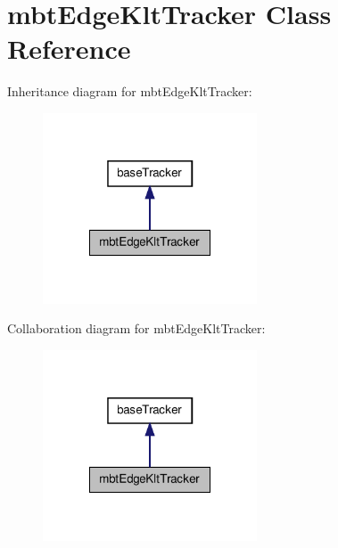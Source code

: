 \hypertarget{classmbtEdgeKltTracker}{\section{mbt\-Edge\-Klt\-Tracker \-Class \-Reference}
\label{classmbtEdgeKltTracker}
}


\-Inheritance diagram for mbt\-Edge\-Klt\-Tracker\-:\nopagebreak
\begin{figure}[H]
\begin{center}
\leavevmode
\includegraphics[width=180pt]{classmbtEdgeKltTracker__inherit__graph}
\end{center}
\end{figure}


\-Collaboration diagram for mbt\-Edge\-Klt\-Tracker\-:\nopagebreak
\begin{figure}[H]
\begin{center}
\leavevmode
\includegraphics[width=180pt]{classmbtEdgeKltTracker__coll__graph}
\end{center}
\end{figure}
